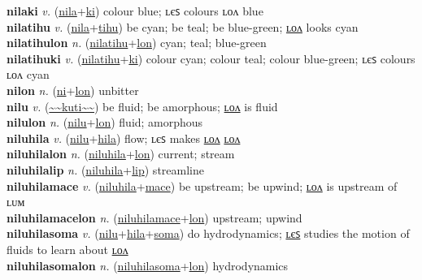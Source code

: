 \textbf{nilaki} \textit{v.} (\hyperref[nila]{nila}+\hyperref[ki]{ki})
colour blue; ʟєꜱ colours ʟᴏᴧ blue \label{nilaki} \\
\textbf{nilatihu} \textit{v.} (\hyperref[nila]{nila}+\hyperref[tihu]{tihu})
be cyan; be teal; be blue-green; \hyperref[nilatihulon]{ʟᴏᴧ} looks cyan \label{nilatihu} \\
\textbf{nilatihulon} \textit{n.} (\hyperref[nilatihu]{nilatihu}+\hyperref[lon]{lon})
cyan; teal; blue-green \label{nilatihulon} \\
\textbf{nilatihuki} \textit{v.} (\hyperref[nilatihu]{nilatihu}+\hyperref[ki]{ki})
colour cyan; colour teal; colour blue-green; ʟєꜱ colours ʟᴏᴧ cyan \label{nilatihuki} \\
\textbf{nilon} \textit{n.} (\hyperref[ni]{ni}+\hyperref[lon]{lon})
unbitter \label{nilon} \\
\textbf{nilu} \textit{v.} (\hyperref[kuti]{\~{}\~{}kuti\~{}\~{}})
be fluid; be amorphous; \hyperref[nilulon]{ʟᴏᴧ} is fluid \label{nilu} \\
\textbf{nilulon} \textit{n.} (\hyperref[nilu]{nilu}+\hyperref[lon]{lon})
fluid; amorphous \label{nilulon} \\
\textbf{niluhila} \textit{v.} (\hyperref[nilu]{nilu}+\hyperref[hila]{hila})
flow; ʟєꜱ makes \hyperref[niluhilalon]{ʟᴏᴧ} \hyperref[niluhilalon]{ʟᴏᴧ} \label{niluhila} \\
\textbf{niluhilalon} \textit{n.} (\hyperref[niluhila]{niluhila}+\hyperref[lon]{lon})
current; stream \label{niluhilalon} \\
\textbf{niluhilalip} \textit{n.} (\hyperref[niluhila]{niluhila}+\hyperref[lip]{lip})
streamline \label{niluhilalip} \\
\textbf{niluhilamace} \textit{v.} (\hyperref[niluhila]{niluhila}+\hyperref[mace]{mace})
be upstream; be upwind; \hyperref[niluhilamacelon]{ʟᴏᴧ} is upstream of ʟᴜᴍ \label{niluhilamace} \\
\textbf{niluhilamacelon} \textit{n.} (\hyperref[niluhilamace]{niluhilamace}+\hyperref[lon]{lon})
upstream; upwind \label{niluhilamacelon} \\
\textbf{niluhilasoma} \textit{v.} (\hyperref[nilu]{nilu}+\hyperref[hila]{hila}+\hyperref[soma]{soma})
do hydrodynamics; \hyperref[niluhilasomales]{ʟєꜱ} studies the motion of fluids to learn about \hyperref[niluhilasomalon]{ʟᴏᴧ} \label{niluhilasoma} \\
\textbf{niluhilasomalon} \textit{n.} (\hyperref[niluhilasoma]{niluhilasoma}+\hyperref[lon]{lon})
hydrodynamics \label{niluhilasomalon} \\
